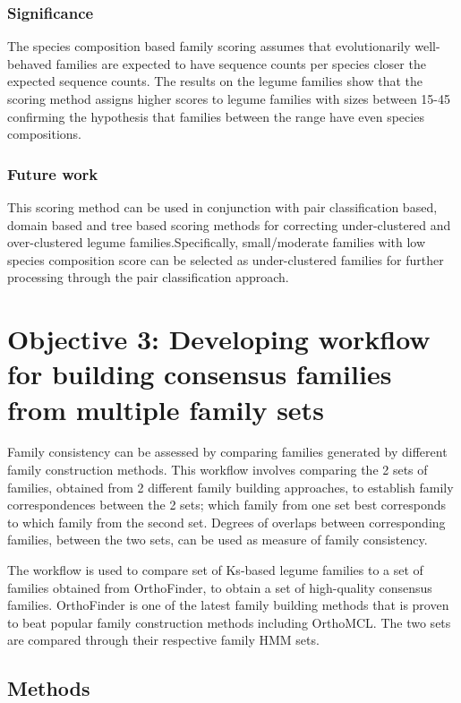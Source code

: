 \documentclass{article}
\begin{document}
		\subsubsection{Significance}
		The species composition based family scoring assumes that evolutionarily well-behaved families are expected to have sequence counts per species closer the expected sequence counts. The results on the legume families show that the scoring method assigns higher scores to legume families with sizes between 15-45 confirming the hypothesis that families between the range have even species compositions.
	
		\subsubsection{Future work}
		This scoring method can be used in conjunction with pair classification based, domain based and tree based scoring methods for correcting under-clustered and over-clustered legume families.Specifically, small/moderate families with low species composition score can be selected as under-clustered families for further processing through the pair classification approach. 
	\pagebreak
	
	
	\section{Objective 3: Developing workflow for building consensus families from multiple family sets}
	Family consistency can be assessed by comparing families generated by different family construction methods. This workflow involves comparing the 2 sets of families, obtained from 2 different family building approaches, to establish family correspondences between the 2 sets; which family from one set best corresponds to which family from the second set. Degrees of overlaps between corresponding families, between the two sets, can be used as measure of family consistency.
	
	The workflow is used to compare set of Ks-based legume families to a set of families obtained from OrthoFinder, to obtain a set of high-quality consensus families. OrthoFinder is one of the latest family building methods that is proven to beat popular family construction methods including OrthoMCL. The two sets are compared through their respective family HMM sets.
	
		\subsection{Methods}
\end{document}
